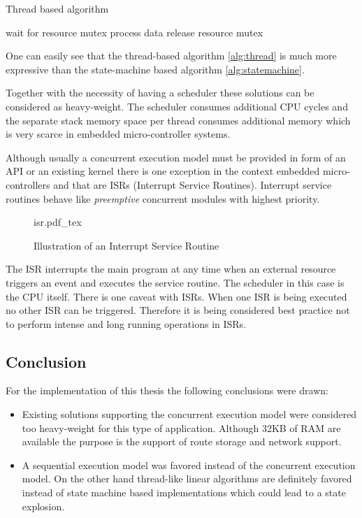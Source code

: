 \begin{algorithm}[H]
\caption{Thread based algorithm}
\label{alg:thread}
\begin{algorithmic}
    \STATE wait for resource mutex
    \STATE process data
    \STATE release resource mutex
\ENDWHILE
\end{algorithmic}
\end{algorithm}

One can easily see that the thread-based algorithm \ref{alg:thread} is much more expressive than the state-machine based algorithm \ref{alg:statemachine}.

Together with the necessity of having a scheduler these solutions can be considered as heavy-weight. The scheduler consumes additional CPU cycles and the separate stack memory space per thread consumes additional memory which is very scarce in embedded micro-controller systems.

Although usually a concurrent execution model must be provided in form of an API or an existing kernel there is one exception in the context embedded micro-controllers and that are ISRs (Interrupt Service Routines). Interrupt service routines behave like \emph{preemptive} concurrent modules with highest priority.

\begin{figure}[H]
\centering
{isr.pdf_tex}
\caption[]{Illustration of an Interrupt Service Routine}
\end{figure}

The ISR interrupts the main program at any time when an external resource triggers an event and executes the service routine. The scheduler in this case is the CPU itself. There is one caveat with ISRs. When one ISR is being executed no other ISR can be triggered. Therefore it is being considered best practice not to perform intense and long running operations in ISRs.

\subsection{Conclusion}
For the implementation of this thesis the following conclusions were drawn:

\begin{itemize}
\item Existing solutions supporting the concurrent execution model were considered too heavy-weight for this type of application. Although 32KB of RAM are available the purpose is the support of route storage and network support.
\item A sequential execution model was favored instead of the concurrent execution model. On the other hand thread-like linear algorithms are definitely favored instead of state machine based implementations which could lead to a state explosion.
\end{itemize}

